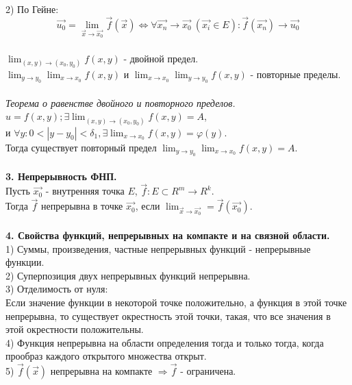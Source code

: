 \documentclass[12pt]{article}
\begin{document}
2) По Гейне:\\
$$\overrightarrow{u_0} = \lim_{\overrightarrow{x}\to\overrightarrow{x_0}} \overrightarrow{f}(\overrightarrow{x}) \iff \forall \overrightarrow{x_n} \rightarrow \overrightarrow{x_0} \  (\overrightarrow{x_i} \in E) : \overrightarrow{f} (\overrightarrow{x_n}) \rightarrow \overrightarrow{u_0}$$\\
$\lim_{(x,y)\to(x_0,y_0)} f(x,y)$ - двойной предел.\\
$\lim_{y\to y_0}\lim_{x\to x_0} f(x,y)$ и $\lim_{x\to x_0}\lim_{y\to y_0} f(x,y)$ - повторные пределы.\\
\\
\label{question2_3}\emph{Теорема о равенстве двойного и повторного пределов.}\\
$u = f(x,y); \exists \lim_{(x,y)\to(x_0,y_0)} f(x,y) = A$, \\и $\forall y : 0 < |y-y_0| < \delta_1, \exists \lim_{x\to x_0} f(x,y) = \varphi (y)$.\\
Тогда существует повторный предел $\lim_{y\to y_0} \lim_{x\to x_0} f(x,y) = A$.\\
\\
\label{question3}\textbf{3. Непрерывность ФНП.}\\
Пусть $\overrightarrow{x_0}$ - внутренняя точка $E$, $\overrightarrow{f} : E \subset R^m \to R^k$.\\
Тогда $\overrightarrow{f}$ непрерывна в точке $\overrightarrow{x_0}$, если $\lim_{\overrightarrow{x}\to\overrightarrow{x_0}}=\overrightarrow{f}(\overrightarrow{x_0})$.\\
\\
\label{question4}\textbf{4. Свойства функций, непрерывных на компакте и на связной области.}\\
1) Суммы, произведения, частные непрерывных функций - непрерывные функции.\\
2) Суперпозиция двух непрерывных функций непрерывна.\\
3) Отделимость от нуля:\\
Если значение функции в некоторой точке положительно, а функция в этой точке непрерывна, то существует окрестность этой точки, такая, что все значения в этой окрестности положительны.\\
4) Функция непрерывна на области определения тогда и только тогда, когда прообраз каждого открытого множества открыт.\\
5) $\overrightarrow{f}(\overrightarrow{x})$ непрерывна на компакте $\Rightarrow \overrightarrow{f}$ - ограничена.\\
\end{document}
